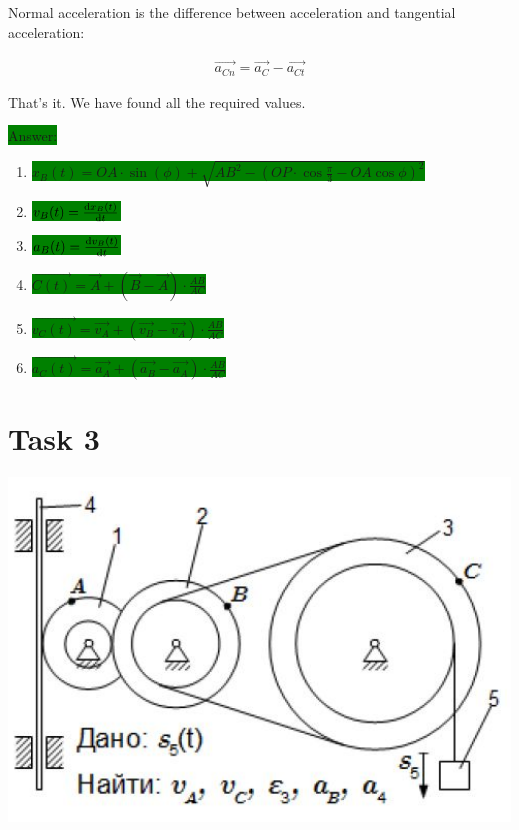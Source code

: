 \documentclass{article}
\begin{document}
Normal acceleration is the difference between acceleration and tangential acceleration:

\begin{align}
    \vec{a_{Cn}} = \vec{a_C} - \vec{a_{Ct}}
\end{align}

That's it. We have found all the required values.

\colorbox{green}{Answer:}

\begin{enumerate}
    \item \colorbox{green}{$x_B(t) = OA \cdot \sin{(\phi)} + \sqrt{AB^2 - (OP \cdot \cos{\frac{\pi}{3}} - OA \cos{\phi})^2}$}
    \item \colorbox{green}{$v_B(t) = \dv{x_B(t)}{t}$}
    \item \colorbox{green}{$a_B(t) = \dv{v_B(t)}{t}$}
    \item \colorbox{green}{$\vec{C(t)} = \vec{A} + (\vec{B} - \vec{A}) \cdot \frac{AB}{AC}$}
    \item \colorbox{green}{$\vec{v_C(t)} = \vec{v_A} + (\vec{v_B} - \vec{v_A}) \cdot \frac{AB}{AC}$}
    \item \colorbox{green}{$\vec{a_C(t)} = \vec{a_A} + (\vec{a_B} - \vec{a_A}) \cdot \frac{AB}{AC}$}
\end{enumerate}

\newpage

\section{Task 3}

\includegraphics[width=\textwidth]{fig3.png}
\end{document}
